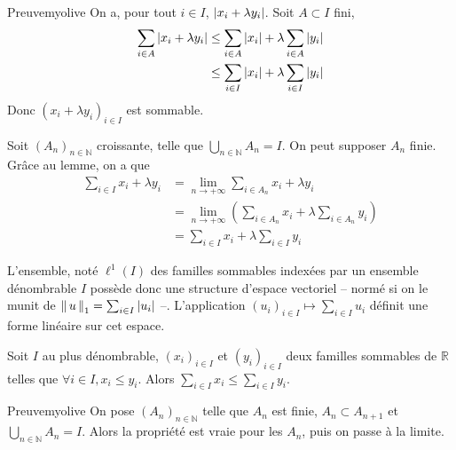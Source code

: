     \begin{demo}{Preuve}{myolive}
        On a, pour tout $i \in I$, $\left\lvert x_i + \lambda y_i\right\rvert$. Soit $A \subset I$ fini, 
        \begin{align*}
            \sum_{i \in A} \left\lvert x_i + \lambda y_i\right\rvert 
            &\leq \sum_{i \in A} \left\lvert x_i\right\rvert + \lambda \sum_{i \in A} \left\lvert y_i\right\rvert \\
            &\leq \sum_{i \in I} \left\lvert x_i\right\rvert + \lambda \sum_{i \in I} \left\lvert y_i\right\rvert 
        \end{align*}
        Donc $(x_i + \lambda y_i)_{i \in I}$ est sommable.

        Soit $(A_n)_{n \in \mathbb{N}}$ croissante, telle que $\bigcup_{n \in \mathbb{N}} A_n = I$. On peut supposer $A_n$ finie. Grâce au lemme, on a que 
        \begin{align*}
            \sum_{i \in I} x_i + \lambda y_i 
            &= \lim_{n \to +\infty} \sum_{i \in A_n} x_i + \lambda y_i \\ 
            &= \lim_{n \to +\infty} \left(\sum_{i \in A_n} x_i + \lambda \sum_{i \in A_n} y_i\right) \\
            &= \sum_{i \in I} x_i + \lambda \sum_{i \in I} y_i
        \end{align*}
    \end{demo}

    L’ensemble, noté $\ell^1(I)$ des familles sommables indexées par un ensemble dénombrable $I$ possède donc une structure d’espace vectoriel -- normé si on le munit de $\left\lVert\,u\,\right\rVert_1 = \sum_{i \in I} \left\lvert u_i\right\rvert$ --. L’application $(u_i)_{i \in I} \mapsto \sum_{i \in I} u_i$ définit une forme linéaire sur cet espace.

    \begin{prop}{}{}
        Soit $I$ au plus dénombrable, $(x_i)_{i \in I}$ et $(y_i)_{i \in I}$ deux familles sommables de $\mathbb{R}$ telles que $\forall i \in I, x_i \leq y_i$. 
        Alors $\sum_{i \in I} x_i \leq \sum_{i \in I} y_i$.
    \end{prop}

    \begin{demo}{Preuve}{myolive}
        On pose $(A_n)_{n \in \mathbb{N}}$ telle que $A_n$ est finie, $A_n \subset A_{n+1}$ et $\bigcup_{n \in \mathbb{N}} A_n = I$. Alors la propriété est vraie pour les $A_n$, puis on passe à la limite.
    \end{demo}

